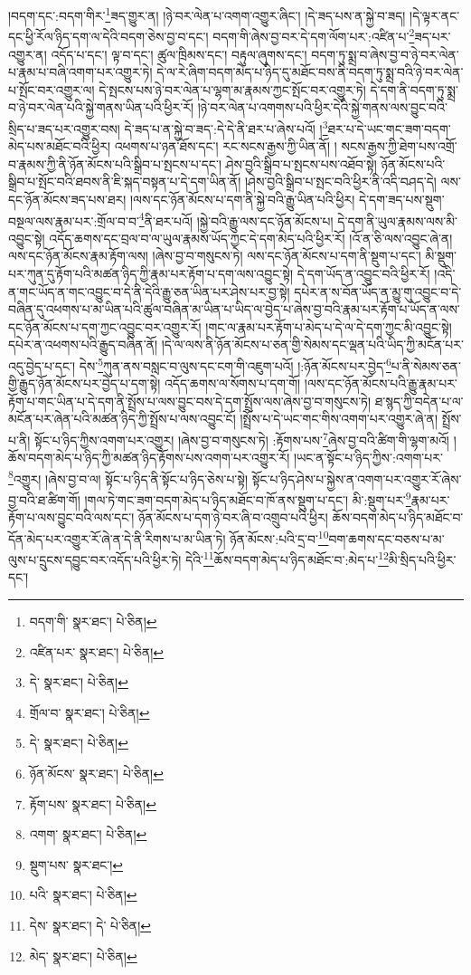 །བདག་དང་:བདག་གིར་\footnote{བདག་གི་  སྣར་ཐང་།  པེ་ཅིན། }ཟད་གྱུར་ན། །ཉེ་བར་ལེན་པ་འགག་འགྱུར་ཞིང་། །དེ་ཟད་པས་ན་སྐྱེ་བ་ཟད། །དེ་ལྟར་ནང་དང་ཕྱི་རོལ་ཉིད་དག་ལ་དེའི་བདག་ཅེས་བྱ་བ་དང་། བདག་གི་ཞེས་བྱ་བར་དེ་དག་ལོག་པར་:འཛིན་པ་\footnote{འཛིན་པར་  སྣར་ཐང་།  པེ་ཅིན། }ཟད་པར་འགྱུར་ན། འདོད་པ་དང་། ལྟ་བ་དང་། ཚུལ་ཁྲིམས་དང་། བརྟུལ་ཞུགས་དང་། བདག་ཏུ་སྨྲ་བ་ཞེས་བྱ་བ་ཉེ་བར་ལེན་པ་རྣམ་པ་བཞི་འགག་པར་འགྱུར་ཏེ། དེ་ལ་རེ་ཞིག་བདག་མེད་པ་ཉིད་དུ་མཐོང་བས་ནི་བདག་ཏུ་སྨྲ་བའི་ཉེ་བར་ལེན་པ་སྤོང་བར་འགྱུར་ལ། དེ་སྤངས་པས་ཉེ་བར་ལེན་པ་ལྷག་མ་རྣམས་ཀྱང་སྤོང་བར་འགྱུར་ཏེ། དེ་དག་ནི་བདག་ཏུ་སྨྲ་བ་ཉེ་བར་ལེན་པའི་སྐྱེ་གནས་ཡིན་པའི་ཕྱིར་རོ། །ཉེ་བར་ལེན་པ་འགགས་པའི་ཕྱིར་དེའི་སྐྱེ་གནས་ལས་བྱུང་བའི་སྲིད་པ་ཟད་པར་འགྱུར་བས། དེ་ཟད་པ་ན་སྐྱེ་བ་ཟད་:དེ་དེ་ནི་ཐར་པ་ཞེས་པའོ། །\footnote{དེ་  སྣར་ཐང་།  པེ་ཅིན། }ཐར་པ་དེ་ཡང་གང་ཟག་བདག་མེད་པས་མཐོང་བའི་ཕྱིར། འཕགས་པ་ཉན་ཐོས་དང་། རང་སངས་རྒྱས་ཀྱི་ཡིན་ནོ། །
སངས་རྒྱས་ཀྱི་ཐེག་པས་འགྲོ་བ་རྣམས་ཀྱི་ནི་ཉོན་མོངས་པའི་སྒྲིབ་པ་སྤངས་པ་དང་། ཤེས་བྱའི་སྒྲིབ་པ་སྤངས་པས་འཐོབ་སྟེ། ཉོན་མོངས་པའི་སྒྲིབ་པ་སྤོང་བའི་ཐབས་ནི་ཇི་སྐད་བསྟན་པ་དེ་དག་ཡིན་ནོ། །ཤེས་བྱའི་སྒྲིབ་པ་སྤང་བའི་ཕྱིར་ནི་འདི་བཤད་དེ། ལས་དང་ཉོན་མོངས་ཟད་པས་ཐར། །ལས་དང་ཉོན་མོངས་པ་དག་ནི་སྐྱེ་བའི་རྒྱུ་ཡིན་པའི་ཕྱིར། དེ་དག་ཟད་པས་སྡུག་བསྔལ་ལས་རྣམ་པར་:གྲོལ་བ་བ་\footnote{གྲོལ་བ་  སྣར་ཐང་།  པེ་ཅིན། }ནི་ཐར་པའོ། །སྐྱེ་བའི་རྒྱུ་ལས་དང་ཉོན་མོངས་པ། དེ་དག་ནི་ཡུལ་རྣམས་ལས་མི་འབྱུང་སྟེ། འདོད་ཆགས་དང་བྲལ་བ་ལ་ཡུལ་རྣམས་ཡོད་ཀྱང་དེ་དག་མེད་པའི་ཕྱིར་རོ། །འོ་ན་ཅི་ལས་འབྱུང་ཞེ་ན། ལས་དང་ཉོན་མོངས་རྣམ་རྟོག་ལས། །ཞེས་བྱ་བ་གསུངས་ཏེ། ལས་དང་ཉོན་མོངས་པ་དག་ནི་སྡུག་པ་དང་། མི་སྡུག་པར་ཀུན་དུ་རྟོག་པའི་མཚན་ཉིད་ཀྱི་རྣམ་པར་རྟོག་པ་དག་ལས་འབྱུང་སྟེ། དེ་དག་ཡོད་ན་འབྱུང་བའི་ཕྱིར་རོ། །འདི་ན་གང་ཡོད་ན་གང་འབྱུང་བ་དེ་ནི་དེའི་རྒྱུ་ཅན་ཡིན་པར་ཤེས་པར་བྱ་སྟེ། དཔེར་ན་ས་བོན་ཡོད་ན་མྱུ་གུ་འབྱུང་བ་དེ་བཞིན་དུ་འཕགས་པ་མ་ཡིན་པའི་ཚུལ་བཞིན་མ་ཡིན་པ་ཡིད་ལ་བྱེད་པ་ཞེས་བྱ་བའི་རྣམ་པར་རྟོག་པ་ཡོད་ན་ལས་དང་ཉོན་མོངས་པ་དག་ཀྱང་འབྱུང་བར་འགྱུར་རོ། །གང་ལ་རྣམ་པར་རྟོག་པ་མེད་པ་དེ་ལ་དེ་དག་ཀྱང་མི་འབྱུང་སྟེ། དཔེར་ན་འཕགས་པའི་རྒྱུད་བཞིན་ནོ། །དེ་ལ་ལས་ནི་ཉོན་མོངས་པ་ཅན་གྱི་སེམས་དང་ལྡན་པའི་ཡིད་ཀྱི་མངོན་པར་འདུ་བྱེད་པ་དང་། དེས་\footnote{དེ་  སྣར་ཐང་།  པེ་ཅིན། }ཀུན་ནས་བསླང་བ་ལུས་དང་ངག་གི་འཇུག་པའོ། །:ཉོན་མོངས་པར་བྱེད་\footnote{ཉོན་མོངས་  སྣར་ཐང་།  པེ་ཅིན། }པ་ནི་སེམས་ཅན་གྱི་རྒྱུད་ཉོན་མོངས་པར་བྱེད་པ་དག་སྟེ། འདོད་ཆགས་ལ་སོགས་པ་དག་གོ། །ལས་དང་ཉོན་མོངས་པའི་རྒྱུ་རྣམ་པར་རྟོག་པ་གང་ཡིན་པ་དེ་དག་ནི་སྤྲོས་པ་ལས་བྱུང་བས་དེ་དག་སྤྲོས་ལས་ཞེས་བྱ་བ་གསུངས་ཏེ། ཐ་སྙད་ཀྱི་བདེན་པ་ལ་མངོན་པར་ཞེན་པའི་མཚན་ཉིད་ཀྱི་སྤྲོས་པ་ལས་འབྱུང་ངོ། །སྤྲོས་པ་དེ་ཡང་གང་གིས་འགག་པར་འགྱུར་ཞེ་ན། སྤྲོས་པ་ནི། སྟོང་པ་ཉིད་ཀྱིས་འགག་པར་འགྱུར། །ཞེས་བྱ་བ་གསུངས་ཏེ། :རྟོགས་པས་\footnote{རྟོག་པས་  སྣར་ཐང་།  པེ་ཅིན། }ཞེས་བྱ་བའི་ཚིག་གི་ལྷག་མའོ། །ཆོས་བདག་མེད་པ་ཉིད་ཀྱི་མཚན་ཉིད་རྟོགས་པས་འགག་པར་འགྱུར་རོ། །ཡང་ན་སྟོང་པ་ཉིད་ཀྱིས་:འགག་པར་\footnote{འགག་  སྣར་ཐང་།  པེ་ཅིན། }འགྱུར། །ཞེས་བྱ་བ་ལ། སྟོང་པ་ཉིད་ནི་སྟོང་པ་ཉིད་ཅེས་པ་སྟེ། སྟོང་པ་ཉིད་ཤེས་པ་སྐྱེས་ན་འགག་པར་འགྱུར་རོ་ཞེས་བྱ་བའི་ཐ་ཚིག་གོ། །གལ་ཏེ་གང་ཟག་བདག་མེད་པ་ཉིད་མཐོང་བ་ཁོ་ནས་སྡུག་པ་དང་། མི་:སྡུག་པར་\footnote{སྡུག་པས་  སྣར་ཐང་། }རྣམ་པར་རྟོག་པ་ལས་བྱུང་བའི་ལས་དང་། ཉོན་མོངས་པ་དག་ཉེ་བར་ཞི་བ་འགྲུབ་པའི་ཕྱིར། ཆོས་བདག་མེད་པ་ཉིད་མཐོང་བ་དོན་མེད་པར་འགྱུར་རོ་ཞེ་ན་དེ་ནི་རིགས་པ་མ་ཡིན་ཏེ། ཉོན་མོངས་:པའི་དྲ་བ་\footnote{པའི་  སྣར་ཐང་།  པེ་ཅིན། }བག་ཆགས་དང་བཅས་པ་མ་ལུས་པ་དྲུངས་དབྱུང་བར་འདོད་པའི་ཕྱིར་ཏེ། དེའི་\footnote{དེས་  སྣར་ཐང་། དེ་  པེ་ཅིན། }ཆོས་བདག་མེད་པ་ཉིད་མཐོང་བ་:མེད་པ་\footnote{མེད་  སྣར་ཐང་།  པེ་ཅིན། }མི་སྲིད་པའི་ཕྱིར་དང་། 